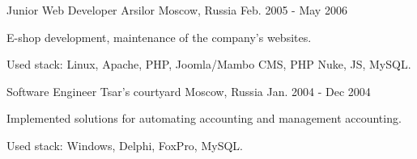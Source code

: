 \begin{cventries}
  \cventry
    {Junior Web Developer}
    {Arsilor}
    {Moscow, Russia}
    {Feb. 2005 - May 2006}
    {
      \begin{cvitems}
        \item {E-shop development, maintenance of the company's websites.}
        \item {Used stack: Linux, Apache, PHP, Joomla/Mambo CMS, PHP Nuke, JS, MySQL.}
      \end{cvitems}
    }

  \cventry
    {Software Engineer}
    {Tsar's courtyard}
    {Moscow, Russia}
    {Jan. 2004 - Dec 2004}
    {
      \begin{cvitems}
        \item {Implemented solutions for automating accounting and management accounting.}
        \item {Used stack: Windows, Delphi, FoxPro, MySQL.}
      \end{cvitems}
    }

\end{cventries}

